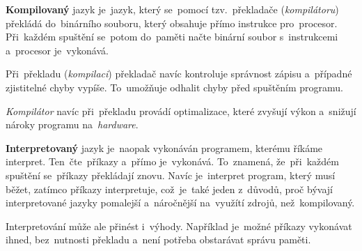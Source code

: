 \documentclass[11pt,a4paper]{report}
\begin{document}
            \textbf{Kompilovaný} jazyk je~jazyk, který se~pomocí tzv.~překladače (\emph{kompilátoru}) překládá do~binárního souboru, který obsahuje přímo instrukce pro~procesor. Při~každém spuštění se~potom do~paměti načte binární soubor s~instrukcemi a~procesor je~vykonává.
            
            Při~překladu (\emph{kompilaci}) překladač navíc kontroluje správnost zápisu a~případné zjistitelné chyby vypíše. To~umožňuje odhalit chyby před spuštěním programu.

            \emph{Kompilátor} navíc při~překladu provádí optimalizace, které zvyšují výkon a~snižují nároky programu na~\emph{hardware}.

            \textbf{Interpretovaný} jazyk je~naopak vykonáván programem, kterému říkáme interpret. Ten~čte~příkazy a~přímo je~vykonává. To~znamená, že~při~každém spuštění se~příkazy překládají znovu. Navíc je~interpret program, který musí běžet, zatímco příkazy interpretuje, což~je~také jeden z~důvodů, proč bývají interpretované jazyky pomalejší a~náročnější na~využítí zdrojů, než~kompilovaný.
            
            Interpretování může ale přinést i~výhody. Například je~možné příkazy vykonávat ihned, bez~nutnosti překladu a~není potřeba obstarávat správu paměti. \cite{ueda:compiled}
        
\end{document}
